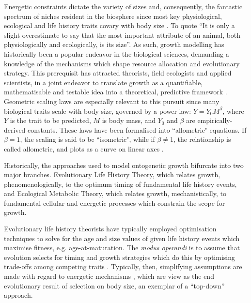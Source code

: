 \documentclass[a4paper]{article} %
\begin{document}
    Energetic constraints dictate the variety of sizes and, consequently, the fantastic spectrum of niches resident in the biosphere since most key physiological, ecological and life history traits covary with body size \autocite{peters1983, brown2000-scaling-book,schmidt1984scaling,Marshall2019b}. To quote \cite{Bartholomew1981} ``It is only a slight overestimate to say that the most important attribute of an animal, both physiologically and ecologically, is its size''. As such, growth modelling has historically been a popular endeavor in the biological sciences, demanding a knowledge of the mechanisms which shape resource allocation and evolutionary strategy. This prerequisit has attracted theorists, field ecologists and applied scientists, in a joint endeavor to translate growth as a quantifiable, mathematisable and testable idea into a theoretical, predictive framework \autocite{popper1962,popper1972,peters1983, West2011}. Geometric scaling laws are especially relevant to this pursuit since many biological traits scale with body size, governed by a power law: $Y = Y_0 M^{\beta}$, where $Y$ is the trait to be predicted, $M$ is body mass, and $Y_0$ and $\beta$ are empirically-derived constants. These laws have been formalised into ``allometric" equations. If $\beta = 1$, the scaling is said to be ``isometric", while if $\beta \neq 1$, the relationship is called allometric, and plots as a curve on linear axes \autocite{brown2000-scaling-book}.

    Historically, the approaches used to model ontogenetic growth bifurcate into two major branches. Evolutionary Life History Theory, which relates growth, phenomenologically, to the optimum timing of fundamental life history events, and Ecological Metabolic Theory, which relates growth, mechanistically, to fundamental cellular and energetic processes which constrain the scope for growth.
        
    Evolutionary life history theorists have typically employed optimisation techniques to solve for the age and size values of given life history events which maximise fitness, e.g. age-at-maturation. The \textit{modus operandi} is to assume that evolution selects for timing and growth strategies which do this by optimising trade-offs among competing traits \autocite{Day1997, Stearns1989, stearns1992evolution}. Typically, then, simplifying assumptions are made with regard to energetic mechanisms \autocite{Day1997, Kozowski1987-indeterminate}, which are view as the end evolutionary result of selection on body size, an exemplar of a ``top-down'' approach.
        
\end{document}
